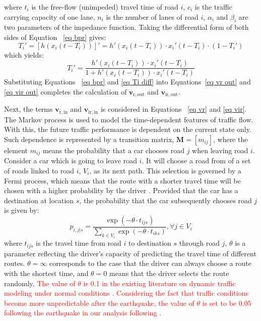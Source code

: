 \documentclass[review,11pt,nonatbib]{elsarticle}
\begin{document}
where $t_i$ is the free-flow (unimpeded) travel time of road $i$, $c_i$ is the traffic carrying capacity of one lane, $n_i$ is the number of lanes of road $i$, $\alpha_i$ and $\beta_i$ are two parameters of the impedance function. Taking the differential form of both sides of Equation ~\eqref{eq bpr} gives:
\begin{equation}
T_i'=[h(x_i(t-T_i))]' = h'(x_i(t-T_i))\cdot x_i'(t-T_i)\cdot (1-T_i')
\end{equation}
which yields:
\begin{equation}\label{eq Ti diff}
T_i'=\frac{h'(x_i(t-T_i))\cdot x_i'(t-T_i)}{1+h'(x_i(t-T_i))\cdot x_i'(t-T_i)}
\end{equation}
Substituting Equations ~\eqref{eq bpr} and \eqref{eq Ti diff} into Equations~\eqref{eq vr out} and \eqref{eq vir out} completes the calculation of $\mathbf{v}_{\mathrm{r,out}}$ and $\mathbf{v}_{\mathrm{ir,out}}$.
\par Next, the terms $\mathbf{v}_{\mathrm{r,in}}$ and $\mathbf{v}_{\mathrm{ir,in}}$ is considered in Equations ~\eqref{eq vr} and \eqref{eq vir}. The Markov process is used to model the time-dependent features of traffic flow. With this, the future traffic performance is dependent on the current state only. Such dependence is represented by a transition matrix, $\mathbf{M}=[m_{ij}]$, where the element $m_{ij}$ means the probability that a car chooses road $j$ when leaving road $i$.  Consider a car which is going to leave road $i$. It will choose a road from of a set of roads linked to road $i$, $V_i$, as its next path. This selection is governed by a Fermi process, which means that the route with a shorter travel time will be chosen with a higher probability by the driver \citep{lam1999stochastic,wu2010universality}. Provided that the car has a destination at location $s$, the probability that the car subsequently chooses road $j$ is given by:
\begin{equation}\label{eq pijs}
p_{i,j|s}=\frac{\exp(-\theta \cdot t_{ijs})}{\sum_{k\in V_i}\exp(-\theta\cdot t_{iks})}, \forall j\in V_i
\end{equation}
where $t_{ijs}$ is the travel time from road $i$ to destination $s$ through road $j$, $\theta$ is a parameter reflecting the driver's capacity of predicting the travel time of different routes. $\theta=\infty$ corresponds to the case that the driver can always choose a route with the shortest time, and $\theta=0$ means that the driver selects the route randomly. \textcolor{red}{The value of $\theta$ is 0.1 in the existing literature on dynamic traffic modeling under normal conditions \citep{nguyen1998implicit,lam1999stochastic}. Considering the fact that traffic conditions become more unpredictable after the earthquake, the value of $\theta$ is set to be 0.05 following the earthquake in our analysis following \citet{feng2017post}. }
\end{document}
